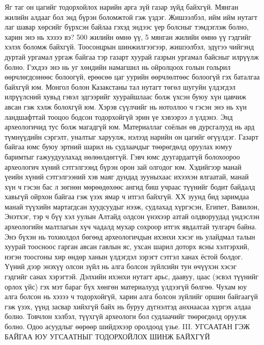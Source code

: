 Яг таг он цагийг тодорхойлох нарийн арга зүй газар зүйд байхгүй. Мянган жилийн алдааг бол энд бүрэн боломжтой гэж үздэг. Жишээлбэл, ийм ийм нутагт лаг шавар хөрсийг бүрхсэн байлаа гэхэд эндээс үер болсныг тэмдэглэж болно, харин энэ нь хэзээ вэ? 500 жилийн өмнө үү, 5 мянган жилийн өмнө үү гэдгийг хэлэх боломж байхгүй. Тоосонцрын шинжилгээгээр, жишээлбэл, эдүгээ чийгэнд дуртай ургамал ургаж байгаа тэр газарт хуурай газрын ургамал байсныг илрүүлж болно. Гэхдээ энэ нь уг хөндийн намагшил нь ойролцоох голын гольрил өөрчлөгдсөнөөс болоогүй, ерөөсөө цаг уурийн өөрчлөлтөөс болоогүй гэх баталгаа байхгүй юм. Монгол болон Казакстаны тал нутагт төгөл шугуйн үлдэгдэл илрүүлсний хувьд гэвэл эдгээрийг хуурайшлаас болж үхсэн буюу хүн цавчиж авсан гэж хэлж болохгүй юм. Хэрэв сүүлчийг нь нотоллоо ч гэсэн энэ нь хүн ландшафттай тооцоо бодсон тодорхойгүй эрин үе хэвээрээ л үлдэнэ.
Энд археологичид тус болж магадгүй юм. Материаллаг соёлын өв дурсгалууд нь ард түмнүүдийн сэргэлт, уналтыг харуулж, нэлээд нарийн он цагийг өгүүлдэг. Газарт байгаа юмс буюу эртний шарил нь судлаачдыг төөрөгдөлд оруулах юмуу баримтыг гажуудуулахад нөлөөлдөггүй. Гэвч юмс дуугардаггүй болохоороо археологич хүний сэтгэлгээнд бүрэн орон зай олгодог юм. Хэдийгээр манай үеийн хүний сэтгэлгээний хэв маяг дундад зууныхаас ихээхэн ялгаатай, манай хүн ч гэсэн бас л зөгнөн мөрөөдөхөөс ангид биш учраас түүнийг бодит байдалд хавьгүй ойрхон байгаа гэж үзэх ямар ч итгэл байхгүй.
ХХ зуунд бид заримдаа манай түүхийн мартагдсан хуудсуудыг нээж, судлахад хүргэсэн, Египет, Вавилон, Энэтхэг, тэр ч бүү хэл уулын Алтайд олдсон үнэхээр азтай олдворуудад үндэслэн археологийн малтлагын хүч чадалд мухар сохроор итгэх явдалтай тулгарч байна. Энэ бүхэн нь тохиолдол бөгөөд археологичдын ихэнхи хэсэг нь улайдмал талын хуурай тоосноос гарган авсан гавлын яс, ухсан шарил доторх ясны хэлтэрхий, нэгэн тоосгоны хир өндөр ханын үлдэгдэл зэрэгт сэтгэл ханах ёстой болдог. Үүний дээр энэхүү олсон зүйл нь алга болсон зүйлсийн тун өчүүхэн хэсэг гэдгийг санах хэрэгтэй. Дэлхийн ихэнхи нутагт арьс, даавуу, цаас (эсвэл түүнийг орлох үйс) гэх мэт бараг бүх хөнгөн материалууд үлдээгүй бөлгөө. Чухам юу алга болсон нь хэзээ ч тодорхойгүй, харин алга болсон зүйлийг оршин байгаагүй гэж үзэх, үүнд засвар хийхгүй байх нь буруу дүгнэлтэд анхнаасаа хүргэх алдаа болно. Товчлон хэлбэл, түүхгүй археологи бол судлаачийг төөрөгдөлд оруулж болно. Одоо асуудлыг өөрөөр шийдэхээр оролдоод үзье.
III. УГСААТАН ГЭЖ БАЙГАА ЮУ
УГСААТНЫГ ТОДОРХОЙЛОХ ШИНЖ БАЙХГҮЙ
